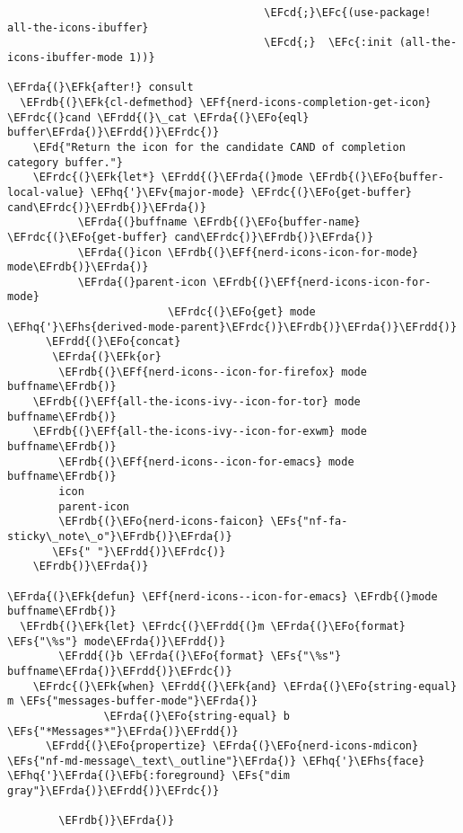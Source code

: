 \documentclass[a4wide,10pt]{article}
\newcommand{\EFc}[1]{\textcolor{EFc}{#1}} %
\newcommand{\EFcd}[1]{\textcolor{EFcd}{#1}} %
\newcommand{\EFs}[1]{\textcolor{EFs}{#1}} %
\newcommand{\EFd}[1]{\textcolor{EFd}{#1}} %
\newcommand{\EFk}[1]{\textcolor{EFk}{#1}} %
\newcommand{\EFb}[1]{\textcolor{EFb}{#1}} %
\newcommand{\EFf}[1]{\textcolor{EFf}{#1}} %
\newcommand{\EFv}[1]{\textcolor{EFv}{#1}} %
\newcommand{\EFo}[1]{\textcolor{EFo}{#1}} %
\newcommand{\EFhq}[1]{\textcolor{EFhq}{#1}} %
\newcommand{\EFhs}[1]{\textcolor{EFhs}{#1}} %
\newcommand{\EFrda}[1]{\textcolor{EFrda}{#1}} %
\newcommand{\EFrdb}[1]{\textcolor{EFrdb}{#1}} %
\newcommand{\EFrdc}[1]{\textcolor{EFrdc}{#1}} %
\newcommand{\EFrdd}[1]{\textcolor{EFrdd}{#1}} %
\begin{document}
\begin{Code}
\begin{Verbatim}
                                        \EFcd{;}\EFc{(use-package! all-the-icons-ibuffer}
                                        \EFcd{;}  \EFc{:init (all-the-icons-ibuffer-mode 1))}

\EFrda{(}\EFk{after!} consult
  \EFrdb{(}\EFk{cl-defmethod} \EFf{nerd-icons-completion-get-icon} \EFrdc{(}cand \EFrdd{(}\_cat \EFrda{(}\EFo{eql} buffer\EFrda{)}\EFrdd{)}\EFrdc{)}
    \EFd{"Return the icon for the candidate CAND of completion category buffer."}
    \EFrdc{(}\EFk{let*} \EFrdd{(}\EFrda{(}mode \EFrdb{(}\EFo{buffer-local-value} \EFhq{'}\EFv{major-mode} \EFrdc{(}\EFo{get-buffer} cand\EFrdc{)}\EFrdb{)}\EFrda{)}
           \EFrda{(}buffname \EFrdb{(}\EFo{buffer-name} \EFrdc{(}\EFo{get-buffer} cand\EFrdc{)}\EFrdb{)}\EFrda{)}
           \EFrda{(}icon \EFrdb{(}\EFf{nerd-icons-icon-for-mode} mode\EFrdb{)}\EFrda{)}
           \EFrda{(}parent-icon \EFrdb{(}\EFf{nerd-icons-icon-for-mode}
                         \EFrdc{(}\EFo{get} mode \EFhq{'}\EFhs{derived-mode-parent}\EFrdc{)}\EFrdb{)}\EFrda{)}\EFrdd{)}
      \EFrdd{(}\EFo{concat}
       \EFrda{(}\EFk{or}
        \EFrdb{(}\EFf{nerd-icons--icon-for-firefox} mode buffname\EFrdb{)}
	\EFrdb{(}\EFf{all-the-icons-ivy--icon-for-tor} mode buffname\EFrdb{)}
	\EFrdb{(}\EFf{all-the-icons-ivy--icon-for-exwm} mode buffname\EFrdb{)}
        \EFrdb{(}\EFf{nerd-icons--icon-for-emacs} mode buffname\EFrdb{)}
        icon
        parent-icon
        \EFrdb{(}\EFo{nerd-icons-faicon} \EFs{"nf-fa-sticky\_note\_o"}\EFrdb{)}\EFrda{)}
       \EFs{" "}\EFrdd{)}\EFrdc{)}
    \EFrdb{)}\EFrda{)}

\EFrda{(}\EFk{defun} \EFf{nerd-icons--icon-for-emacs} \EFrdb{(}mode buffname\EFrdb{)}
  \EFrdb{(}\EFk{let} \EFrdc{(}\EFrdd{(}m \EFrda{(}\EFo{format} \EFs{"\%s"} mode\EFrda{)}\EFrdd{)}
        \EFrdd{(}b \EFrda{(}\EFo{format} \EFs{"\%s"} buffname\EFrda{)}\EFrdd{)}\EFrdc{)}
    \EFrdc{(}\EFk{when} \EFrdd{(}\EFk{and} \EFrda{(}\EFo{string-equal} m \EFs{"messages-buffer-mode"}\EFrda{)}
               \EFrda{(}\EFo{string-equal} b \EFs{"*Messages*"}\EFrda{)}\EFrdd{)}
      \EFrdd{(}\EFo{propertize} \EFrda{(}\EFo{nerd-icons-mdicon} \EFs{"nf-md-message\_text\_outline"}\EFrda{)} \EFhq{'}\EFhs{face} \EFhq{'}\EFrda{(}\EFb{:foreground} \EFs{"dim gray"}\EFrda{)}\EFrdd{)}\EFrdc{)}

        \EFrdb{)}\EFrda{)}


\end{Verbatim}
\end{Code}
\end{document}
